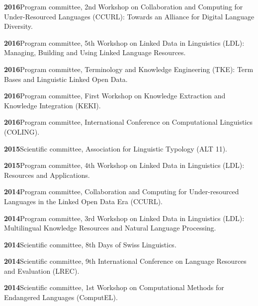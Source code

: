 \documentclass[11pt]{article}
\newcommand{\hangpara}{
 \setlength{\parindent}{0in} %
 \hangindent=0.42in %
}
\begin{document}
\vskip 6pt
\hangpara
{\bf 2016}\hspace{1ex}Program committee, 2nd Workshop on Collaboration and Computing for Under-Resourced Languages (CCURL): Towards an Alliance for Digital Language Diversity.

\vskip 6pt
\hangpara
{\bf 2016}\hspace{1ex}Program committee, 5th Workshop on Linked Data in Linguistics (LDL): Managing, Building and Using Linked Language Resources.

\vskip 6pt
\hangpara
{\bf 2016}\hspace{1ex}Program committee, Terminology and Knowledge Engineering (TKE): Term Bases and Linguistic Linked Open Data.

\vskip 6pt
\hangpara
{\bf 2016}\hspace{1ex}Program committee, First Workshop on Knowledge Extraction and Knowledge Integration (KEKI).

\vskip 6pt
\hangpara
{\bf 2016}\hspace{1ex}Program committee, International Conference on Computational Linguistics (COLING).

\vskip 6pt
\hangpara
{\bf 2015}\hspace{1ex}Scientific committee, Association for Linguistic Typology (ALT 11).

\vskip 6pt
\hangpara
{\bf 2015}\hspace{1ex}Program committee, 4th Workshop on Linked Data in Linguistics (LDL): Resources and Applications.

\vskip 6pt
\hangpara
{\bf 2014}\hspace{1ex}Program committee, Collaboration and Computing for Under-resourced Languages in the Linked Open Data Era (CCURL).

\vskip 6pt
\hangpara
{\bf 2014}\hspace{1ex}Program committee, 3rd Workshop on Linked Data in Linguistics (LDL): Multilingual Knowledge Resources and Natural Language Processing.

\vskip 6pt
\hangpara
{\bf 2014}\hspace{1ex}Scientific committee, 8th Days of Swiss Linguistics.

\vskip 6pt
\hangpara
{\bf 2014}\hspace{1ex}Scientific committee, 9th International Conference on Language Resources and Evaluation (LREC).

\vskip 6pt
\hangpara
{\bf 2014}\hspace{1ex}Scientific committee, 1st Workshop on Computational Methods for Endangered Languages (ComputEL).
\end{document}
